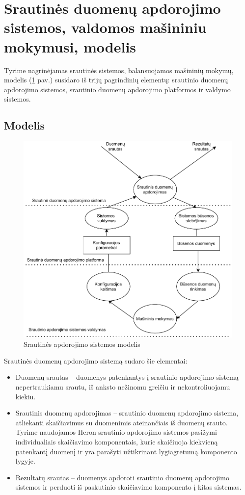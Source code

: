 \documentclass{VUMIFPSbakalaurinis}
\begin{document}
\section{Srautinės duomenų apdorojimo sistemos, valdomos mašininiu mokymusi, modelis}

Tyrime nagrinėjamas srautinės sistemos, balansuojamos mašininių mokymų, modelis (\ref{dataflow} pav.) susidaro iš trijų pagrindinių elementų: srautinio duomenų apdorojimo sistemos, srautinio duomenų apdorojimo platformos ir valdymo sistemos. 
\subsection{Modelis}
\begin{figure}[H]
    \includegraphics[width=15cm]{img/DataFlow.pdf}
    \caption{Srautinės apdorojimo sistemos modelis}
    \label{dataflow}
\end{figure} 
Srautinės duomenų apdorojimo sistemą sudaro šie elementai:
\begin{itemize}
    \item Duomenų srautas – duomenys patenkantys į srautinio apdorojimo sistemą nepertraukiamu srautu, iš anksto nežinomu greičiu ir nekontroliuojamu kiekiu.
    \item Srautinis duomenų apdorojimas – srautinio duomenų apdorojimo sistema, atliekanti skaičiavimus su duomenimis ateinančiais iš duomenų srauto. Tyrime naudojamos Heron srautinio apdorojimo sistemos pasižymi individualiais skaičiavimo komponentais, kurie skaičiuoja kiekvieną patenkantį duomenį ir yra parašyti užtikrinant lygiagretumą komponento lygyje.
    \item Rezultatų srautas – duomenys apdoroti srautinio duomenų apdorojimo sistemos ir perduoti iš paskutinio skaičiavimo komponento į kitas sistemas.
\end{itemize}
\end{document}
